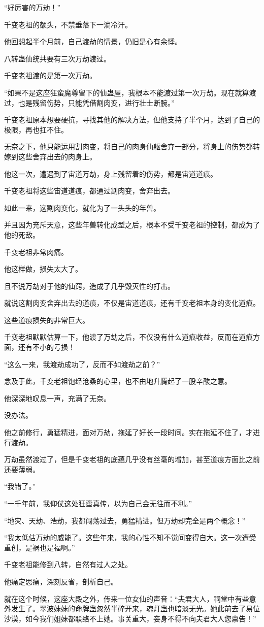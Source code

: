 \begin{this_body}
“好厉害的万劫！”

千变老祖的额头，不禁垂落下一滴冷汗。

他回想起半个月前，自己渡劫的情景，仍旧是心有余悸。

八转蛊仙统共要有三次万劫渡过。

千变老祖渡的是第一次万劫。

“如果不是这座狂蛮魔尊留下的仙蛊屋，我根本不能渡过第一次万劫。现在就算渡过，也是残留伤势，只能凭借割肉变，进行壮士断腕。”

千变老祖原本想要硬抗，寻找其他的解决方法，但他支持了半个月，达到了自己的极限，再也扛不住。

无奈之下，他只能运用割肉变，将自己的肉身仙躯舍弃一部分，将身上的伤势都转嫁到这些舍弃出去的肉身上。

他这一次，遭遇到了宙道万劫，身上残留着的伤势，都是宙道道痕。

千变老祖将这些宙道道痕，都通过割肉变，舍弃出去。

如此一来，这割肉变化，就化为了一头头的年兽。

并且因为充斥天意，这些年兽转化成型之后，根本不受千变老祖的控制，都成为了他的死敌。

千变老祖非常肉痛。

他这样做，损失太大了。

且不说万劫对于他的仙窍，造成了几乎毁灭性的打击。

就说这割肉变舍弃出去的道痕，不仅是宙道道痕，还有千变老祖本身的变化道痕。

这些道痕损失的非常巨大。

千变老祖默默估算一下，他渡了万劫之后，不仅没有什么道痕收益，反而在道痕方面，还有不小的亏损！

“这么一来，我渡劫成功了，反而不如渡劫之前？”

念及于此，千变老祖饱经沧桑的心里，也不由地升腾起了一股辛酸之意。

他深深地叹息一声，充满了无奈。

没办法。

他之前修行，勇猛精进，面对万劫，拖延了好长一段时间。实在拖延不住了，才进行渡劫。

万劫虽然渡过了，但是千变老祖的底蕴几乎没有丝毫的增加，甚至道痕方面比之前还要薄弱。

“我错了。”

“一千年前，我仰仗这处狂蛮真传，以为自己会无往而不利。”

“地灾、天劫、浩劫，我都闯荡过去，勇猛精进。但万劫却完全是两个概念！”

“我太低估万劫的威能了。这些年来，我的心性不知不觉间变得自大。这一次遭受重创，是祸也是福啊。”

千变老祖能修到八转，自然有过人之处。

他痛定思痛，深刻反省，剖析自己。

就在这个时候，这座大殿之外，传来一位女仙的声音：“夫君大人，祠堂中有些意外发生了。翠波妹妹的命牌蛊忽然半碎开来，魂灯蛊也暗淡无光。她此前去了易位沙漠，如今我们姐妹都联络不上她。事关重大，妾身不得不向夫君大人您禀告！”

\end{this_body}

